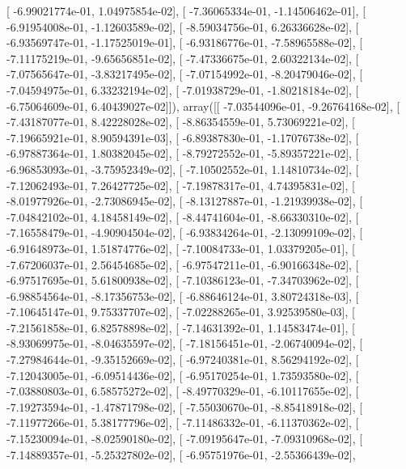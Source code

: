 \documentclass{article}
\begin{document}
       [ -6.99021774e-01,   1.04975854e-02],
       [ -7.36065334e-01,  -1.14506462e-01],
       [ -6.91954008e-01,  -1.12603589e-02],
       [ -8.59034756e-01,   6.26336628e-02],
       [ -6.93569747e-01,  -1.17525019e-01],
       [ -6.93186776e-01,  -7.58965588e-02],
       [ -7.11175219e-01,  -9.65656851e-02],
       [ -7.47336675e-01,   2.60322134e-02],
       [ -7.07565647e-01,  -3.83217495e-02],
       [ -7.07154992e-01,  -8.20479046e-02],
       [ -7.04594975e-01,   6.33232194e-02],
       [ -7.01938729e-01,  -1.80218184e-02],
       [ -6.75064609e-01,   6.40439027e-02]]), array([[ -7.03544096e-01,  -9.26764168e-02],
       [ -7.43187077e-01,   8.42228028e-02],
       [ -8.86354559e-01,   5.73069221e-02],
       [ -7.19665921e-01,   8.90594391e-03],
       [ -6.89387830e-01,  -1.17076738e-02],
       [ -6.97887364e-01,   1.80382045e-02],
       [ -8.79272552e-01,  -5.89357221e-02],
       [ -6.96853093e-01,  -3.75952349e-02],
       [ -7.10502552e-01,   1.14810734e-02],
       [ -7.12062493e-01,   7.26427725e-02],
       [ -7.19878317e-01,   4.74395831e-02],
       [ -8.01977926e-01,  -2.73086945e-02],
       [ -8.13127887e-01,  -1.21939938e-02],
       [ -7.04842102e-01,   4.18458149e-02],
       [ -8.44741604e-01,  -8.66330310e-02],
       [ -7.16558479e-01,  -4.90904504e-02],
       [ -6.93834264e-01,  -2.13099109e-02],
       [ -6.91648973e-01,   1.51874776e-02],
       [ -7.10084733e-01,   1.03379205e-01],
       [ -7.67206037e-01,   2.56454685e-02],
       [ -6.97547211e-01,  -6.90166348e-02],
       [ -6.97517695e-01,   5.61800938e-02],
       [ -7.10386123e-01,  -7.34703962e-02],
       [ -6.98854564e-01,  -8.17356753e-02],
       [ -6.88646124e-01,   3.80724318e-03],
       [ -7.10645147e-01,   9.75337707e-02],
       [ -7.02288265e-01,   3.92539580e-03],
       [ -7.21561858e-01,   6.82578898e-02],
       [ -7.14631392e-01,   1.14583474e-01],
       [ -8.93069975e-01,  -8.04635597e-02],
       [ -7.18156451e-01,  -2.06740094e-02],
       [ -7.27984644e-01,  -9.35152669e-02],
       [ -6.97240381e-01,   8.56294192e-02],
       [ -7.12043005e-01,  -6.09514436e-02],
       [ -6.95170254e-01,   1.73593580e-02],
       [ -7.03880803e-01,   6.58575272e-02],
       [ -8.49770329e-01,  -6.10117655e-02],
       [ -7.19273594e-01,  -1.47871798e-02],
       [ -7.55030670e-01,  -8.85418918e-02],
       [ -7.11977266e-01,   5.38177796e-02],
       [ -7.11486332e-01,  -6.11370362e-02],
       [ -7.15230094e-01,  -8.02590180e-02],
       [ -7.09195647e-01,  -7.09310968e-02],
       [ -7.14889357e-01,  -5.25327802e-02],
       [ -6.95751976e-01,  -2.55366439e-02],
\end{document}
